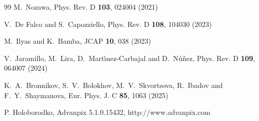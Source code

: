 \documentclass[floats,floatfix,showpacs,amssymb,prd,superscriptaddress,nofootinbib,nolongbibliography,reprint]{revtex4-2}
\begin{document}
\begin{thebibliography}{99}
M.~Nozawa,
Phys. Rev. D \textbf{103}, 024004 (2021)

V.~De Falco and S.~Capozziello,
Phys. Rev. D \textbf{108}, 104030 (2023)

M.~Ilyas and K.~Bamba,
JCAP \textbf{10}, 038 (2023)

V.~Jaramillo, M.~Lira, D.~Mart{\'\i}nez-Carbajal and D.~N{\'u}{\~n}ez,
Phys. Rev. D \textbf{109}, 064007 (2024)

K.~A.~Bronnikov, S.~V.~Bolokhov, M.~V.~Skvortsova, R.~Ibadov and F.~Y.~Shaymanova,
Eur. Phys. J. C \textbf{85}, 1063 (2025)



P. Holoborodko, 
Advanpix 5.1.0.15432,
http://www.advanpix.com


\end{thebibliography}
\end{document}
